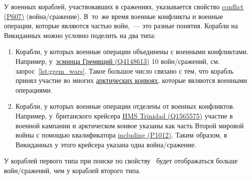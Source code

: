 \newpage
У военных кораблей, участвовавших в сражениях, 
указывается свойство 
\href{https://www.wikidata.org/wiki/Property:P607}{conflict (P607)} (война/сражение). 
В~то~же время военные конфликты и военные операции, 
которые являются частью войн,~--- это разные понятия. 
Корабли на Викиданных можно условно поделить на два типа:

\begin{enumerate}
  \item Корабли, у которых военные операции объединены с военными конфликтами. 
      Например, у~\href{https://www.wikidata.org/wiki/Q4148613}{эсминца Гремящий (Q4148613)} 10 войн/сражений, 
        см. запрос~\ref{lst:grem_wars}. 
        Такое большое число связано с тем, 
        что корабль принял участие во многих 
        \href{https://ru.wikipedia.org/wiki/Арктические_конвои}{арктических конвоях}, 
        которые являются военными операциями.
  \item Корабли, у которых военные операции отделены от военных конфликтов. 
      Например, у~британского крейсера 
        \href{https://www.wikidata.org/wiki/Q1565575}{HMS Trinidad (Q1565575)} 
        участие в военной кампании и арктическом конвое указаны как часть Второй мировой войны 
        с помощью квалификатора 
        \href{https://www.wikidata.org/wiki/Property:P1012}{including (P1012)}. 
        Таким образом, в Викиданных у этого крейсера указана одна война/сра\-жение.
\end{enumerate}

У кораблей первого типа при поиске по свойству~ будет отображаться больше войн/сражений, чем у кораблей второго типа. 


